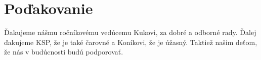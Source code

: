 \section*{Poďakovanie}

Ďakujeme nášmu ročníkovému vedúcemu Kukovi, za dobré a odborné rady. Ďalej ďakujeme KSP, že je také
čarovné a Koníkovi, že je úžasný. Taktiež našim deťom, že nás v budúcnosti budú podporovať.
